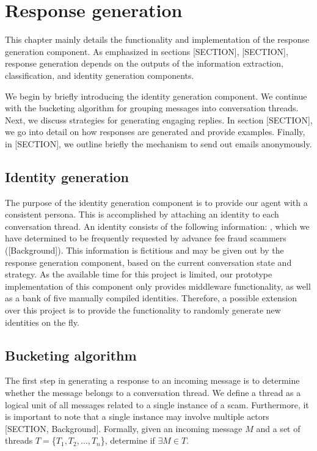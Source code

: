 \chapter{Response generation}

This chapter mainly details the functionality and implementation of the response generation component. As emphasized in sections [SECTION], [SECTION], response generation depends on the outputs of the information extraction, classification, and identity generation components. 

We begin by briefly introducing the identity generation component. We continue with the bucketing algorithm for grouping messages into conversation threads. Next, we discuss strategies for generating engaging replies. In section [SECTION], we go into detail on how responses are generated and provide examples. Finally, in [SECTION], we outline briefly the mechanism to send out emails anonymously.

\section{Identity generation}
The purpose of the identity generation component is to provide our agent with a consistent persona. This is accomplished by attaching an identity to each conversation thread. An identity consists of the following information: , which we have determined to be frequently requested by advance fee fraud scammers ([Background]). This information is fictitious and may be given out by the response generation component, based on the current conversation state and strategy. As the available time for this project is limited, our prototype implementation of this component only provides middleware functionality, as well as a bank of five manually compiled identities. Therefore, a possible extension over this project is to provide the functionality to randomly generate new identities on the fly.

\section{Bucketing algorithm}
The first step in generating a response to an incoming message is to determine whether the message belongs to a conversation thread. We define a thread as a logical unit of all messages related to a single instance of a scam. Furthermore, it is important to note that a single instance may involve multiple actors [SECTION, Background]. Formally, given an incoming message $M$ and a set of threads $T = $\{$T_{1}, T_{2}, ..., T_{n}$\}, determine if $\exists M \in T$.
	

